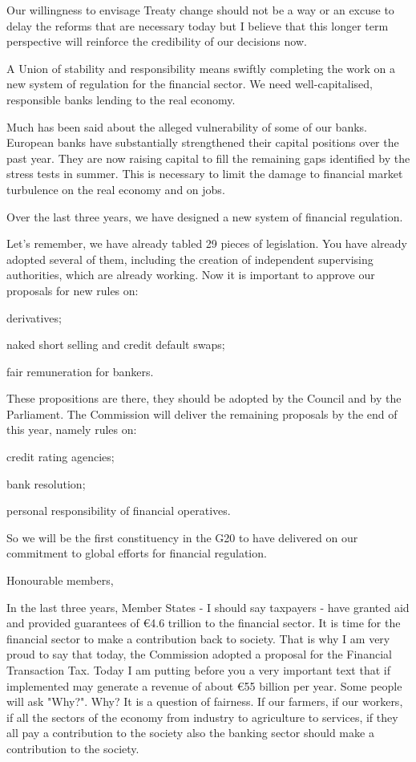 \documentclass[a4paper,11pt]{article}
\begin{document}
Our willingness to envisage Treaty change should not be a way or an excuse to delay the reforms that are necessary today but I believe that this longer term perspective will reinforce the credibility of our decisions now.

A Union of stability and responsibility means swiftly completing the work on a new system of regulation for the financial sector. We need well-capitalised, responsible banks lending to the real economy.

Much has been said about the alleged vulnerability of some of our banks. European banks have substantially strengthened their capital positions over the past year. They are now raising capital to fill the remaining gaps identified by the stress tests in summer. This is necessary to limit the damage to financial market turbulence on the real economy and on jobs.

Over the last three years, we have designed a new system of financial regulation.

Let's remember, we have already tabled 29 pieces of legislation. You have already adopted several of them, including the creation of independent supervising authorities, which are already working. Now it is important to approve our proposals for new rules on:

    derivatives;

    naked short selling and credit default swaps;

    fair remuneration for bankers.

These propositions are there, they should be adopted by the Council and by the Parliament. The Commission will deliver the remaining proposals by the end of this year, namely rules on:

    credit rating agencies;

    bank resolution;

    personal responsibility of financial operatives.

So we will be the first constituency in the G20 to have delivered on our commitment to global efforts for financial regulation.

Honourable members,

In the last three years, Member States - I should say taxpayers - have granted aid and provided guarantees of \euro 4.6 trillion to the financial sector. It is time for the financial sector to make a contribution back to society. That is why I am very proud to say that today, the Commission adopted a proposal for the Financial Transaction Tax. Today I am putting before you a very important text that if implemented may generate a revenue of about \euro 55 billion per year. Some people will ask "Why?". Why? It is a question of fairness. If our farmers, if our workers, if all the sectors of the economy from industry to agriculture to services, if they all pay a contribution to the society also the banking sector should make a contribution to the society.
\end{document}
